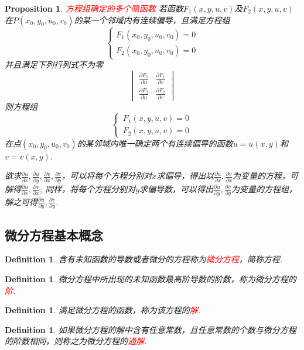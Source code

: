 \documentclass{article}
\newtheorem{proposition}[theorem]{Proposition}
\newtheorem{definition}[theorem]{Definition}
\newcommand{\redt}[1]{\textcolor{red}{#1}}
\begin{document}
\begin{proposition}
\rm \redt{方程组确定的多个隐函数} 若函数$F_1(x,y,u,v)$及$F_2(x,y,u,v)$在$P(x_0,y_0,u_0,v_0)$的某一个邻域内有连续偏导，且满足方程组
$$
\left \{
\begin{array}{ll}
F_1(x_0,y_0,u_0,v_0) = 0 \\
F_2(x_0,y_0,u_0,v_0) = 0
\end{array} \right.
$$
并且满足下列行列式不为零
$$
\begin{vmatrix}
\frac{\partial F_1}{\partial u} & \frac{\partial F_1}{\partial v} \\
\frac{\partial F_2}{\partial u} & \frac{\partial F_2}{\partial v}
\end{vmatrix}
$$
则方程组
$$
\left \{
\begin{array}{ll}
F_1(x,y,u,v) = 0 \\
F_2(x,y,u,v) = 0
\end{array} \right.
$$
在点$(x_0,y_0,u_0,v_0)$的某邻域内唯一确定两个有连续偏导的函数$u = u(x,y)$和$v=v(x,y)$. 

欲求$\frac{\partial u}{\partial x},\frac{\partial u}{\partial y},\frac{\partial v}{\partial x},\frac{\partial v}{\partial y}$，可以将每个方程分别对$x$求偏导，得出以$\frac{\partial u}{\partial x},\frac{\partial v}{\partial x}$为变量的方程，可解得$\frac{\partial u}{\partial x},\frac{\partial v}{\partial x}$; 同样，将每个方程分别对$y$求偏导数，可以得出$\frac{\partial u}{\partial y},\frac{\partial v}{\partial y}$为变量的方程组，解之可得$\frac{\partial u}{\partial y},\frac{\partial v}{\partial y}$.  
\end{proposition}


\subsection{微分方程基本概念}

\begin{definition}
\rm 含有未知函数的导数或者微分的方程称为\redt{微分方程}，简称方程.
\end{definition}

\begin{definition}
\rm 微分方程中所出现的未知函数最高阶导数的阶数，称为微分方程的\redt{阶}.
\end{definition}

\begin{definition}
\rm 满足微分方程的函数，称为该方程的\redt{解}.
\end{definition}

\begin{definition}
\rm 如果微分方程的解中含有任意常数，且任意常数的个数与微分方程的阶数相同，则称之为微分方程的\redt{通解}. 
\end{definition}
\end{document}
